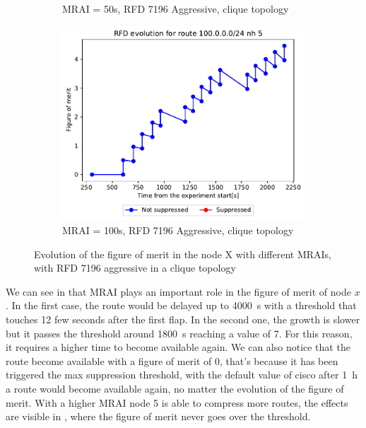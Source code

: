 \begin{figure}[h]
\begin{subfigure}[b]{0.3\textwidth}
         \caption{MRAI = 50s, RFD 7196 Aggressive, clique topology}
         \label{fig:clique_x_mrai50_rfd7196Aggressive}
     \end{subfigure}
     \hfill
     \begin{subfigure}[b]{0.3\textwidth}
         \centering
         \includegraphics[width=\textwidth]{images/RFD/clique/FigureOfMerit/mrai21_RFD_7196_aggressive_x_rfd_R1.pdf}
         \caption{MRAI = 100s, RFD 7196 Aggressive, clique topology}
         \label{fig:clique_x_mrai100_rfd7196Aggressive}
     \end{subfigure}
        \caption{Evolution of the figure of merit in the node X with different MRAIs, with RFD 7196 aggressive in a clique topology}
        \label{fig:clique_nodex_rfd7196Aggressive}
\end{figure}

We can see in 
that \ac{MRAI} plays an important role in the figure of merit of node $x$.
In the first case, the route would be delayed up to \SI{4000}{\second} with a
threshold that touches \num{12} few seconds after the first flap.
In the second one, the growth is slower but it passes the threshold around
\SI{1800}{\second} reaching a value of \num{7}.
For this reason, it requires a higher time to become available again.
We can also notice that the route become available with a figure of merit of
\num{0}, that's because it has been triggered the max suppression threshold,
with the default value of cisco after \SI{1}{\hour} a route would become available
again, no matter the evolution of the figure of merit.
With a higher \ac{MRAI} node \num{5} is able to compress more routes, the effects
are visible in , where the figure of
merit never goes over the threshold.

